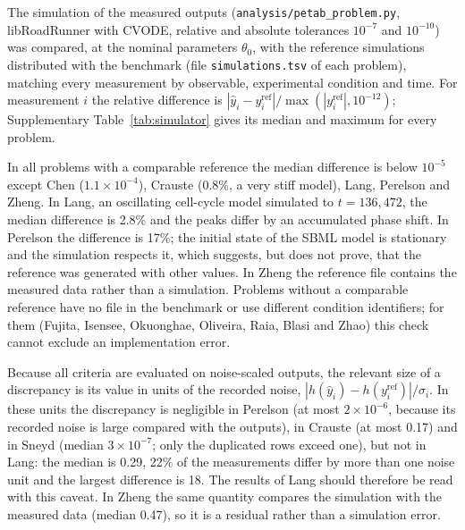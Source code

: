 
The simulation of the measured outputs (\texttt{analysis/petab\_problem.py}, libRoadRunner with CVODE, relative and absolute tolerances $10^{-7}$ and $10^{-10}$) was compared, at the nominal parameters $\theta_0$, with the reference simulations distributed with the benchmark (file \texttt{simulations.tsv} of each problem), matching every measurement by observable, experimental condition and time. For measurement $i$ the relative difference is $|\hat y_i-y^{\mathrm{ref}}_i|/\max(|y^{\mathrm{ref}}_i|,10^{-12})$; Supplementary Table~\ref{tab:simulator} gives its median and maximum for every problem.

In all problems with a comparable reference the median difference is below $10^{-5}$ except Chen ($1.1\times10^{-4}$), Crauste (0.8\%, a very stiff model), Lang, Perelson and Zheng. In Lang, an oscillating cell-cycle model simulated to $t=136{,}472$, the median difference is 2.8\% and the peaks differ by an accumulated phase shift. In Perelson the difference is 17\%; the initial state of the SBML model is stationary and the simulation respects it, which suggests, but does not prove, that the reference was generated with other values. In Zheng the reference file contains the measured data rather than a simulation. Problems without a comparable reference have no file in the benchmark or use different condition identifiers; for them (Fujita, Isensee, Okuonghae, Oliveira, Raia, Blasi and Zhao) this check cannot exclude an implementation error.

Because all criteria are evaluated on noise-scaled outputs, the relevant size of a discrepancy is its value in units of the recorded noise, $|h(\hat y_i)-h(y^{\mathrm{ref}}_i)|/\sigma_i$. In these units the discrepancy is negligible in Perelson (at most $2\times10^{-6}$, because its recorded noise is large compared with the outputs), in Crauste (at most 0.17) and in Sneyd (median $3\times10^{-7}$; only the duplicated rows exceed one), but not in Lang: the median is 0.29, 22\% of the measurements differ by more than one noise unit and the largest difference is 18. The results of Lang should therefore be read with this caveat. In Zheng the same quantity compares the simulation with the measured data (median 0.47), so it is a residual rather than a simulation error.

